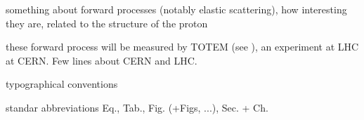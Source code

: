 
\> something about forward processes (notably elastic scattering), how interesting they are, related to the structure of the proton

\> these forward process will be measured by TOTEM (see ), an experiment at LHC at CERN. Few lines about CERN and LHC.

\> typographical conventions

\centerline{\vbox{}}

\> standar abbreviations Eq., Tab., Fig. (+Figs, ...), Sec. + Ch.

